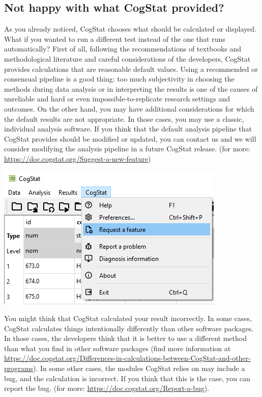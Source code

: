 \documentclass[
]{book}
\begin{document}
\hypertarget{not-happy-with-what-cogstat-provided}{%
\subsection{Not happy with what CogStat provided?}\label{not-happy-with-what-cogstat-provided}}

As you already noticed, CogStat chooses what should be calculated or displayed. What if you wanted to run a different test instead of the one that runs automatically? First of all, following the recommendations of textbooks and methodological literature and careful considerations of the developers, CogStat provides calculations that are reasonable default values. Using a recommended or consensual pipeline is a good thing: too much subjectivity in choosing the methods during data analysis or in interpreting the results is one of the causes of unreliable and hard or even impossible-to-replicate research settings and outcomes. On the other hand, you may have additional considerations for which the default results are not appropriate. In those cases, you may use a classic, individual analysis software. If you think that the default analysis pipeline that CogStat provides should be modified or updated, you can contact us and we will consider modifying the analysis pipeline in a future CogStat release. (for more: \url{https://doc.cogstat.org/Suggest-a-new-feature})

\includegraphics{img/ch1/feature.png}

You might think that CogStat calculated your result incorrectly. In some cases, CogStat calculates things intentionally differently than other software packages. In those cases, the developers think that it is better to use a different method than what you find in other software packages (find more information at \url{https://doc.cogstat.org/Differences-in-calculations-between-CogStat-and-other-programs}). In some other cases, the modules CogStat relies on may include a bug, and the calculation is incorrect. If you think that this is the case, you can report the bug. (for more: \url{https://doc.cogstat.org/Report-a-bug}).
\end{document}
